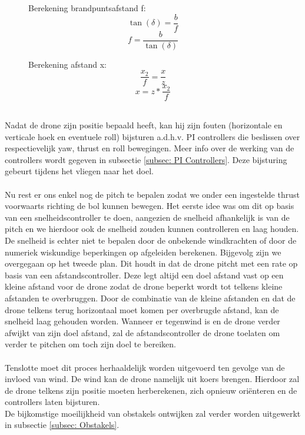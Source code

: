 \begin{figure}[h]
	\centering
	\begin{minipage}{.5\textwidth}
		Berekening brandpuntsafstand f:
		\begin{equation} \label{eq:RelatieveVerticaleHoekBegin}
		\tan(\delta) = \frac{b}{f}
		\end{equation}
		\begin{equation} 
		f = \frac{b}{\tan(\delta)}
		\end{equation}
	\end{minipage}
	\begin{minipage}{.45\textwidth}
		Berekening afstand x:
		\begin{equation} 
		\frac{x_2}{f} = \frac{x}{z}
		\end{equation}
		\begin{equation} \label{eq:RelatieveVerticaleHoekEind}
		x = z * \frac{x_2}{f}	
		\end{equation}
	\end{minipage}%
\end{figure}
\\
Nadat de drone zijn positie bepaald heeft, kan hij zijn fouten (horizontale en verticale hoek en eventuele roll) bijsturen a.d.h.v. PI controllers die beslissen over respectievelijk yaw, thrust en roll bewegingen. Meer info over de werking van de controllers wordt gegeven in subsectie \ref{subsec: PI Controllers}. Deze bijsturing gebeurt tijdens het vliegen naar het doel. 
\\
\\
Nu rest er ons enkel nog de pitch te bepalen zodat we onder een ingestelde thrust voorwaarts richting de bol kunnen bewegen. Het eerste idee was om dit op basis van een snelheidscontroller te doen, aangezien de snelheid afhankelijk is van de pitch en we hierdoor ook de snelheid zouden kunnen controlleren en laag houden. De snelheid is echter niet te bepalen door de onbekende windkrachten of door de numeriek wiskundige beperkingen op afgeleiden berekenen. Bijgevolg zijn we overgegaan op het tweede plan. Dit houdt in dat de drone pitcht met een rate op basis van een afstandscontroller. Deze legt altijd een doel afstand vast op een kleine afstand voor de drone zodat de drone beperkt wordt tot telkens kleine afstanden te overbruggen. Door de combinatie van de kleine afstanden en dat de drone telkens terug horizontaal moet komen per overbrugde afstand, kan de snelheid laag gehouden worden. Wanneer er tegenwind is en de drone verder afwijkt van zijn doel afstand, zal de afstandscontroller de drone toelaten om verder te pitchen om toch zijn doel te bereiken.
\\
\\
Tenslotte moet dit proces herhaaldelijk worden uitgevoerd ten gevolge van de invloed van wind. De wind kan de drone namelijk uit koers brengen. Hierdoor zal de drone telkens zijn positie moeten herberekenen, zich opnieuw ori\"enteren en de controllers laten bijsturen.
\\
De bijkomstige moeilijkheid van obstakels ontwijken zal verder worden uitgewerkt in subsectie \ref{subsec: Obstakels}.